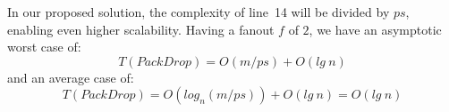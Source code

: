 In our proposed solution, the complexity of line~14 will be divided by $ps$, enabling even higher scalability. Having a fanout $f$ of $2$, we have an asymptotic worst case of:
\begin{equation}
 T(PackDrop) = O(m/ps) + O(lg\ n)
 \label{eq:worstcase}
\end{equation}
and an average case of:
\begin{equation}
 T(PackDrop) = O(log_n(m/ps))+O(lg\ n) = O(lg\ n)
\end{equation}
